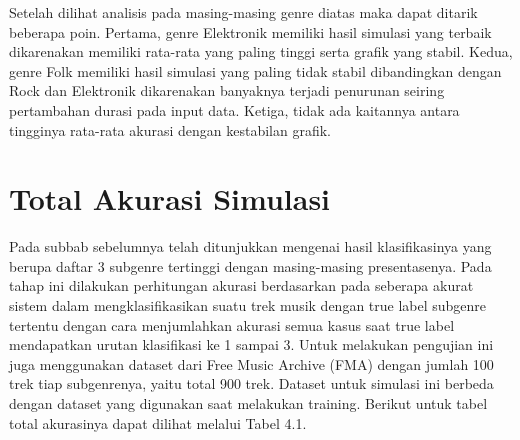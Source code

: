 Setelah dilihat analisis pada masing-masing genre diatas maka dapat ditarik beberapa poin. Pertama, genre Elektronik memiliki hasil simulasi yang terbaik dikarenakan memiliki rata-rata yang paling tinggi serta grafik yang stabil. Kedua, genre Folk memiliki hasil simulasi yang paling tidak stabil dibandingkan dengan Rock dan Elektronik dikarenakan banyaknya terjadi penurunan seiring pertambahan durasi pada input data. Ketiga, tidak ada kaitannya antara tingginya rata-rata akurasi dengan kestabilan grafik.

\section{Total Akurasi Simulasi}
\label{sec:totalakurasi}

Pada subbab sebelumnya telah ditunjukkan mengenai hasil klasifikasinya yang berupa daftar 3 subgenre tertinggi dengan masing-masing presentasenya. Pada tahap ini dilakukan perhitungan akurasi berdasarkan pada seberapa akurat sistem dalam mengklasifikasikan suatu trek musik dengan true label subgenre tertentu dengan cara menjumlahkan akurasi semua kasus saat true label mendapatkan urutan klasifikasi ke 1 sampai 3. Untuk melakukan pengujian ini juga menggunakan dataset dari Free Music Archive (FMA) dengan jumlah 100 trek tiap subgenrenya, yaitu total 900 trek. Dataset untuk simulasi ini berbeda dengan dataset yang digunakan saat melakukan training. Berikut untuk tabel total akurasinya dapat dilihat melalui Tabel 4.1.


